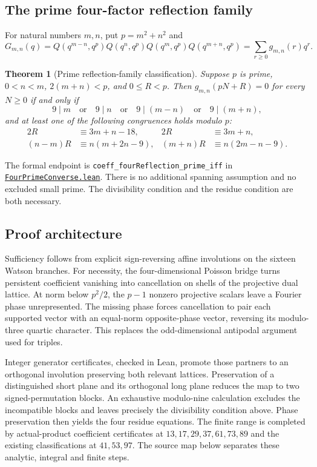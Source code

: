 \documentclass[11pt]{amsart}
\newcommand{\lean}[1]{{\small\nolinkurl{#1}}}
\newcommand{\src}[1]{\href{https://github.com/tomdif/RamanujanLean/blob/main/RamanujanTau/MultiQuintuple#1}{\lean{#1}}}
\newtheorem{theorem}{Theorem}
\theoremstyle{definition}
\begin{document}
\begin{samepage}
\section{The prime four-factor reflection family}
For natural numbers $m,n$, put $p=m^2+n^2$ and
\[
 G_{m,n}(q)=Q(q^{m-n},q^p)Q(q^n,q^p)Q(q^m,q^p)Q(q^{m+n},q^p)
           =\sum_{r\ge0}g_{m,n}(r)q^r.
\]
\begin{theorem}[Prime reflection-family classification]\label{thm:four}
Suppose $p$ is prime, $0<n<m$, $2(m+n)<p$, and $0\le R<p$.
Then $g_{m,n}(pN+R)=0$ for every $N\ge0$ if and only if
\[
 9\mid m\quad\text{or}\quad9\mid n\quad\text{or}\quad9\mid(m-n)
 \quad\text{or}\quad9\mid(m+n),
\]
and at least one of the following congruences holds modulo $p$:
\begin{align*}
 2R&\equiv3m+n-18,& 2R&\equiv3m+n,\\
 (n-m)R&\equiv n(m+2n-9),& (m+n)R&\equiv n(2m-n-9).
\end{align*}
\end{theorem}
\end{samepage}
The formal endpoint is \lean{coeff_fourReflection_prime_iff} in
\src{FourPrimeConverse.lean}. There is no additional spanning assumption
and no excluded small prime. The divisibility condition and the residue
condition are both necessary.

\subsection{Proof architecture}
Sufficiency follows from explicit sign-reversing affine involutions on
the sixteen Watson branches. For necessity, the four-dimensional Poisson
bridge turns persistent coefficient vanishing into cancellation on shells
of the projective dual lattice. At norm below $p^2/2$, the $p-1$ nonzero
projective scalars leave a Fourier phase unrepresented. The missing phase
forces cancellation to pair each supported vector with an equal-norm
opposite-phase vector, reversing its modulo-three quartic character.
This replaces the odd-dimensional antipodal argument used for triples.

Integer generator certificates, checked in Lean, promote those partners
to an orthogonal involution preserving both relevant lattices. Preservation
of a distinguished short plane and its orthogonal long plane reduces the
map to two signed-permutation blocks. An exhaustive modulo-nine calculation
excludes the incompatible blocks and leaves precisely the divisibility
condition above. Phase preservation then yields the four residue equations.
The finite range is completed by actual-product coefficient certificates
at $13,17,29,37,61,73,89$ and the existing classifications at $41,53,97$.
The source map below separates these analytic, integral and finite steps.
\end{document}
